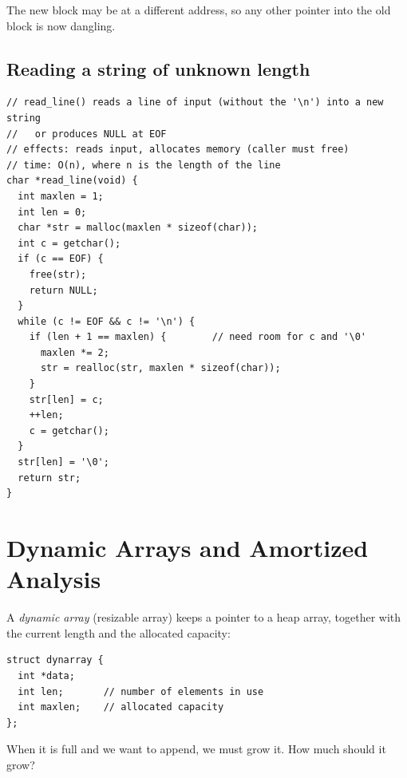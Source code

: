 \begin{center}
\end{center}
The new block may be at a different address, so any other pointer into the old block is now
dangling.

\subsection{Reading a string of unknown length}

\begin{lstlisting}[style=c]
// read_line() reads a line of input (without the '\n') into a new string
//   or produces NULL at EOF
// effects: reads input, allocates memory (caller must free)
// time: O(n), where n is the length of the line
char *read_line(void) {
  int maxlen = 1;
  int len = 0;
  char *str = malloc(maxlen * sizeof(char));
  int c = getchar();
  if (c == EOF) {
    free(str);
    return NULL;
  }
  while (c != EOF && c != '\n') {
    if (len + 1 == maxlen) {        // need room for c and '\0'
      maxlen *= 2;
      str = realloc(str, maxlen * sizeof(char));
    }
    str[len] = c;
    ++len;
    c = getchar();
  }
  str[len] = '\0';
  return str;
}
\end{lstlisting}

\section{Dynamic Arrays and Amortized Analysis}

A \emph{dynamic array} (resizable array) keeps a pointer to a heap array, together with the
current length and the allocated capacity:
\begin{lstlisting}[style=c]
struct dynarray {
  int *data;
  int len;       // number of elements in use
  int maxlen;    // allocated capacity
};
\end{lstlisting}
When it is full and we want to append, we must grow it. How much should it grow?

